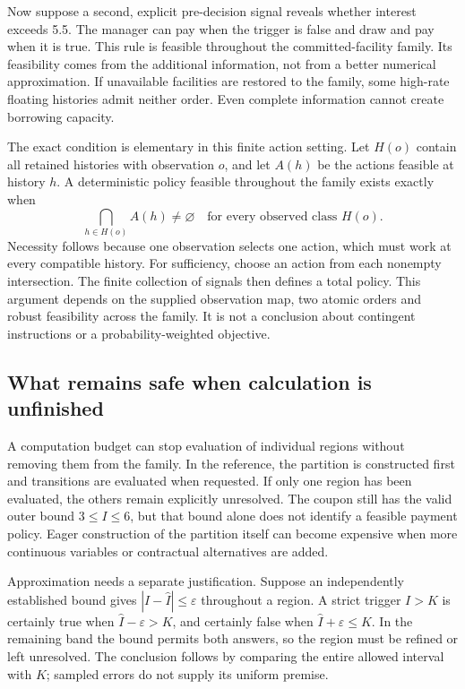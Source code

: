 Now suppose a second, explicit pre-decision signal reveals whether interest exceeds 5.5. The manager can pay when the trigger is false and draw and pay when it is true. This rule is feasible throughout the committed-facility family. Its feasibility comes from the additional information, not from a better numerical approximation. If unavailable facilities are restored to the family, some high-rate floating histories admit neither order. Even complete information cannot create borrowing capacity.

The exact condition is elementary in this finite action setting. Let $H(o)$ contain all retained histories with observation $o$, and let $A(h)$ be the actions feasible at history $h$. A deterministic policy feasible throughout the family exists exactly when
\begin{equation}
 \bigcap_{h\in H(o)}A(h)\ne\varnothing
 \quad\text{for every observed class }H(o).
\end{equation}
Necessity follows because one observation selects one action, which must work at every compatible history. For sufficiency, choose an action from each nonempty intersection. The finite collection of signals then defines a total policy. This argument depends on the supplied observation map, two atomic orders and robust feasibility across the family. It is not a conclusion about contingent instructions or a probability-weighted objective.

\subsection{What remains safe when calculation is unfinished}

A computation budget can stop evaluation of individual regions without removing them from the family. In the reference, the partition is constructed first and transitions are evaluated when requested. If only one region has been evaluated, the others remain explicitly unresolved. The coupon still has the valid outer bound $3\leq I\leq6$, but that bound alone does not identify a feasible payment policy. Eager construction of the partition itself can become expensive when more continuous variables or contractual alternatives are added.

Approximation needs a separate justification. Suppose an independently established bound gives $|I-\widehat I|\leq\varepsilon$ throughout a region. A strict trigger $I>K$ is certainly true when $\widehat I-\varepsilon>K$, and certainly false when $\widehat I+\varepsilon\leq K$. In the remaining band the bound permits both answers, so the region must be refined or left unresolved. The conclusion follows by comparing the entire allowed interval with $K$; sampled errors do not supply its uniform premise.

